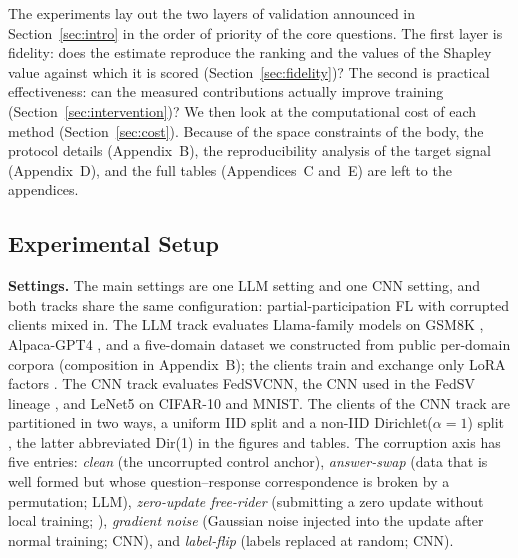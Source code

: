 \documentclass[letterpaper]{article} %
\theoremstyle{definition} %
\begin{document}

The experiments lay out the two layers of validation announced in
Section~\ref{sec:intro} in the order of priority of the core questions. The
first layer is fidelity: does the estimate reproduce the ranking and the
values of the Shapley value against which it is scored
(Section~\ref{sec:fidelity})? The second is practical effectiveness: can the
measured contributions actually improve training
(Section~\ref{sec:intervention})? We then look at the computational cost of
each method (Section~\ref{sec:cost}). Because of the space constraints of the body,
the protocol details (Appendix~B), the reproducibility analysis of the target
signal (Appendix~D), and the full tables (Appendices~C and~E) are left to the
appendices.

\subsection{Experimental Setup}
\label{sec:setup}

\textbf{Settings.} The main settings are one LLM setting and one CNN setting,
and both tracks share the same configuration: partial-participation FL with
corrupted clients mixed in. The LLM track evaluates Llama-family models
\citep{grattafiori2024llama,touvron2023llama} on GSM8K
\citep{cobbe2021training}, Alpaca-GPT4 \citep{peng2023instruction}, and a
five-domain dataset we constructed from public per-domain corpora
(composition in Appendix~B); the clients train and exchange only LoRA
factors \citep{hu2022lora}.
The CNN track evaluates FedSVCNN, the CNN used in the FedSV
lineage \citep{wang2020principled,fan2022improving}, and LeNet5
\citep{lecun1998gradient} on CIFAR-10 \citep{krizhevsky2009learning}
and MNIST. The clients of the CNN
track are partitioned in two ways, a uniform IID split and a non-IID
Dirichlet($\alpha{=}1$) split \citep{hsu2019measuring}, the latter
abbreviated Dir(1) in the figures and tables. The corruption axis has five
entries: \emph{clean} (the uncorrupted control anchor), \emph{answer-swap}
(data that is well formed but whose question--response correspondence is
broken by a permutation; LLM), \emph{zero-update free-rider} (submitting a
zero update without local training; \citealp{lin2019free}), \emph{gradient noise} (Gaussian noise
injected into the update after normal training; CNN), and \emph{label-flip}
(labels replaced at random; CNN).
\end{document}
